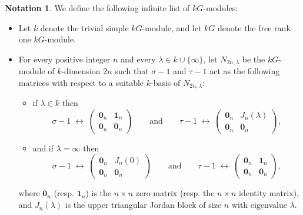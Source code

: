 \documentclass{amsart}
\numberwithin{equation}{section}
\numberwithin{table}{section}
\theoremstyle{plain}
\theoremstyle{definition}
\newtheorem{nota}[theorem]{Notation}
\theoremstyle{remark}
\begin{document}
\begin{nota}
\label{not:indecomposables}
We define the following infinite list of $kG$-modules:
\begin{itemize}
\item[(a)] Let $k$ denote the trivial simple $kG$-module, and let $kG$ denote the free rank one $kG$-module.

\item[(b)] For every positive integer $n$ and every $\lambda\in k\cup\{\infty\}$, let $N_{2n,\lambda}$ be the $kG$-module of $k$-dimension $2n$ such that $\sigma-1$ and $\tau-1$ act as the following matrices with respect to a suitable $k$-basis of $N_{2n,\lambda}$:
\begin{itemize}
\item[$\bullet$] if $\lambda\in k$ then
$$\sigma-1 \;\longleftrightarrow\; \left(\begin{array}{c|c} \mathbf{0}_n&\mathbf{1}_n\\ \hline \mathbf{0}_n&\mathbf{0}_n\end{array}\right)
\qquad\mbox{and}\qquad
\tau-1\;\longleftrightarrow\; \left(\begin{array}{c|c} \mathbf{0}_n&J_n(\lambda)\\ \hline \mathbf{0}_n&\mathbf{0}_n\end{array}\right)  ,$$
\item[$\bullet$] and if $\lambda = \infty$ then
$$\sigma-1 \;\longleftrightarrow\; \left(\begin{array}{c|c} \mathbf{0}_n&J_n(0)\\ \hline \mathbf{0}_n&\mathbf{0}_n\end{array}\right) 
\qquad\mbox{and}\qquad
\tau-1\;\longleftrightarrow\; \left(\begin{array}{c|c} \mathbf{0}_n&\mathbf{1}_n\\ \hline \mathbf{0}_n&\mathbf{0}_n\end{array}\right),$$
\end{itemize}
where $\mathbf{0}_n$ (resp. $\mathbf{1}_n$) is the $n\times n$ zero matrix (resp. the $n\times n$ identity matrix), and $J_n(\lambda)$ is the upper triangular Jordan block of size $n$ with eigenvalue $\lambda$.


\end{itemize}
\end{nota}
\end{document}
